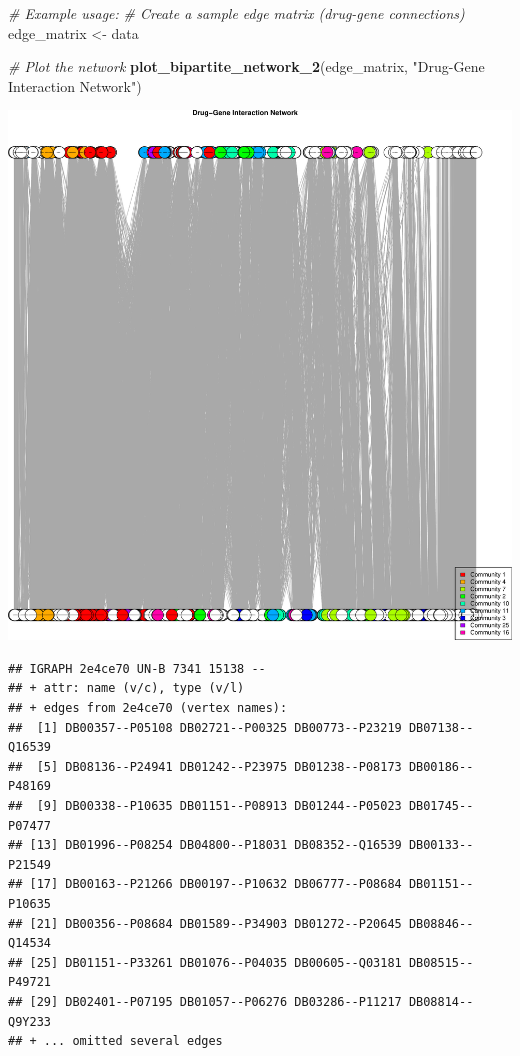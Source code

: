 \documentclass[
]{article}
\newenvironment{Shaded}{\begin{snugshade}}{\end{snugshade}}
\newcommand{\CommentTok}[1]{\textcolor[rgb]{0.56,0.35,0.01}{\textit{#1}}}
\newcommand{\FunctionTok}[1]{\textcolor[rgb]{0.13,0.29,0.53}{\textbf{#1}}}
\newcommand{\NormalTok}[1]{#1}
\newcommand{\OtherTok}[1]{\textcolor[rgb]{0.56,0.35,0.01}{#1}}
\newcommand{\StringTok}[1]{\textcolor[rgb]{0.31,0.60,0.02}{#1}}
\begin{document}
\begin{Shaded}
\begin{Highlighting}[]
\CommentTok{\# Example usage:}
\CommentTok{\# Create a sample edge matrix (drug{-}gene connections)}
\NormalTok{edge\_matrix }\OtherTok{\textless{}{-}}\NormalTok{ data}

\CommentTok{\# Plot the network}
\FunctionTok{plot\_bipartite\_network\_2}\NormalTok{(edge\_matrix, }\StringTok{"Drug{-}Gene Interaction Network"}\NormalTok{)}
\end{Highlighting}
\end{Shaded}

\includegraphics{lab5bio_files/figure-latex/plot2-1.pdf}

\begin{verbatim}
## IGRAPH 2e4ce70 UN-B 7341 15138 -- 
## + attr: name (v/c), type (v/l)
## + edges from 2e4ce70 (vertex names):
##  [1] DB00357--P05108 DB02721--P00325 DB00773--P23219 DB07138--Q16539
##  [5] DB08136--P24941 DB01242--P23975 DB01238--P08173 DB00186--P48169
##  [9] DB00338--P10635 DB01151--P08913 DB01244--P05023 DB01745--P07477
## [13] DB01996--P08254 DB04800--P18031 DB08352--Q16539 DB00133--P21549
## [17] DB00163--P21266 DB00197--P10632 DB06777--P08684 DB01151--P10635
## [21] DB00356--P08684 DB01589--P34903 DB01272--P20645 DB08846--Q14534
## [25] DB01151--P33261 DB01076--P04035 DB00605--Q03181 DB08515--P49721
## [29] DB02401--P07195 DB01057--P06276 DB03286--P11217 DB08814--Q9Y233
## + ... omitted several edges
\end{verbatim}
\end{document}
